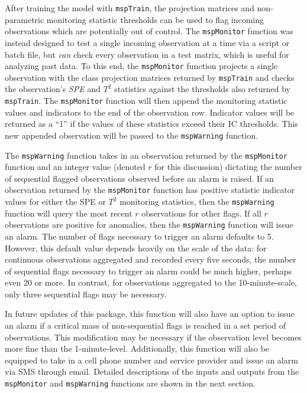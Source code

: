\documentclass{report}\usepackage[]{graphicx}\usepackage[]{color}
\begin{document}
After training the model with \texttt{mspTrain}, the projection matrices and non-parametric monitoring statistic thresholds can be used to flag incoming observations which are potentially out of control. The \texttt{mspMonitor} function was instead designed to test a single incoming observation at a time via a script or batch file, but \emph{can} check every observation in a test matrix, which is useful for analyzing past data. To this end, the \texttt{mspMonitor} function projects a single observation with the class projection matrices returned by \texttt{mspTrain} and checks the observation's \emph{SPE} and $T^2$ statistics against the thresholds also returned by \texttt{mspTrain}. The \texttt{mspMonitor} function will then append the monitoring statistic values and indicators to the end of the observation row. Indicator values will be returned as a ``1'' if the values of these statistics exceed their IC thresholds. This new appended observation will be passed to the \texttt{mspWarning} function.

The \texttt{mspWarning} function takes in an observation returned by the \texttt{mspMonitor} function and an integer value (denoted $r$ for this discussion) dictating the number of sequential flagged observations observed before an alarm is raised. If an observation returned by the \texttt{mspMonitor} function has positive statistic indicator values for either the SPE or $T^2$ monitoring statistics, then the \texttt{mspWarning} function will query the most recent $r$ observations for other flags. If all $r$ observations are positive for anomalies, then the \texttt{mspWarning} function will issue an alarm. The number of flags necessary to trigger an alarm defaults to 5. However, this default value depends heavily on the scale of the data: for continuous observations aggregated and recorded every five seconds, the number of sequential flags necessary to trigger an alarm could be much higher, perhaps even 20 or more. In contrast, for observations aggregated to the 10-minute-scale, only three sequential flags may be necessary.

In future updates of this package, this function will also have an option to issue an alarm if a critical mass of non-sequential flags is reached in a set period of observations. This modification may be necessary if the observation level becomes more fine than the 1-minute-level. Additionally, this function will also be equipped to take in a cell phone number and service provider and issue an alarm via SMS through email. Detailed descriptions of the inputs and outputs from the \texttt{mspMonitor} and \texttt{mspWarning} functions are shown in the next section.
\end{document}

